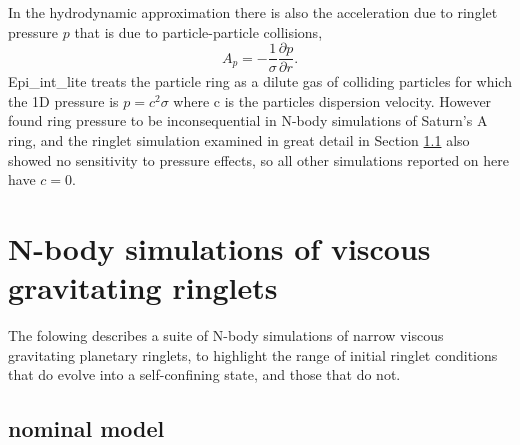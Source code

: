\documentclass[preprint]{aastex62}
\begin{document}
In the hydrodynamic approximation there is also the acceleration due to ringlet pressure $p$
that is due to particle-particle collisions,
\begin{equation}
\label{eqn:pressure}
    A_p=-\frac{1}{\sigma }\frac{\partial p}{\partial r}.
\end{equation}
Epi\_int\_lite treats the particle ring as a dilute gas of
colliding particles for which the 1D pressure is $p=c^2\sigma$ where
c is the particles dispersion velocity. However \cite{HS13} found ring pressure
to be inconsequential in N-body simulations of Saturn's A ring, and the ringlet simulation
examined in great detail in Section \ref{subsec:nominal} 
also showed no sensitivity to pressure effects, so all other
simulations reported on here have $c=0$.

\section{N-body simulations of viscous gravitating ringlets}
\label{sec:nbody}

The folowing describes a suite of N-body simulations of narrow viscous gravitating planetary
ringlets, to highlight the range of initial ringlet conditions that do evolve into
a self-confining state, and those that do not.

\subsection{nominal model}
\label{subsec:nominal}
\end{document}
